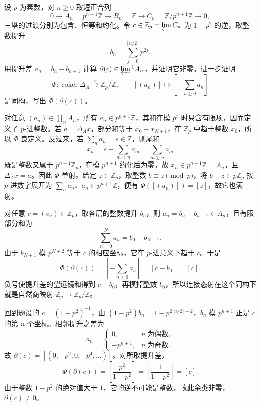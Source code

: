 \begin{exercise}\label{b4:ex:13-boundary-adic-calculation}
	设 \(p\) 为素数，对 \(n\ge0\) 取短正合列
	\[
		0\longrightarrow A_n=p^{n+1}\mathbb Z\longrightarrow B_n=\mathbb Z \longrightarrow C_n=\mathbb Z/p^{n+1}\mathbb Z\longrightarrow0,
	\]
	三塔的过渡分别为包含、恒等和约化。令 \(c\in\mathbb Z_p=\varprojlim C_n\) 为 \(1-p^2\) 的逆，取整数提升
	\[
		b_n=\sum_{j=0}^{\lfloor n/2\rfloor}p^{2j}.
	\]
	用提升差 \(a_n=b_n-b_{n+1}\) 计算 \(\partial(c)\in\varprojlim{}^1A_n\)，并证明它非零。进一步证明
	\[
		\Phi:\operatorname{coker}\Delta_A\xrightarrow{\sim}\mathbb Z_p/\mathbb Z, \qquad [(a_n)]\longmapsto\left[-\sum_{n\ge0}a_n\right]
	\]
	是同构，写出 \(\Phi(\partial(c))\)。
\end{exercise}
\begin{solution}
	对任意 \((a_n)\in\prod_nA_n\)，所有 \(a_n\in p^{n+1}\mathbb Z\)，其和在模 \(p^r\) 时只含有限项，因而定义了 \(p\)-进整数。若 \(a=\Delta_Ax\)，部分和等于 \(x_0-x_{N+1}\)，在 \(\mathbb Z_p\) 中趋于整数 \(x_0\)，所以 \(\Phi\) 良定义。反过来，若 \(\sum_na_n=s\in\mathbb Z\)，则尾和
	\[
		x_n=s-\sum_{m<n}a_m=\sum_{m\ge n}a_m
	\]
	既是整数又属于 \(p^{n+1}\mathbb Z_p\)，在模 \(p^{n+1}\) 约化后为零，故 \(x_n\in p^{n+1}\mathbb Z=A_n\)，且 \(\Delta_Ax=a\)。因此 \(\Phi\) 单射。给定 \(z\in\mathbb Z_p\)，取整数 \(b\equiv z\pmod p\)，将 \(b-z\in p\mathbb Z_p\) 按 \(p\)-进数字展开为 \(\sum_na_n\)、\(a_n\in p^{n+1}\mathbb Z\)，便有 \(\Phi([(a_n)])=[z]\)，故它也满射。

	对任意 \(c=(c_n)\in\mathbb Z_p\)，取各层的整数提升 \(b_n\)，则 \(a_n=b_n-b_{n+1}\in A_n\)，且有限部分和为
	\[
		\sum_{n=0}^Na_n=b_0-b_{N+1}.
	\]
	由于 \(b_{N+1}\) 模 \(p^{N+2}\) 等于 \(c\) 的相应坐标，它在 \(p\)-进意义下趋于 \(c\)。于是
	\[
		\Phi(\partial(c)) =\left[-\sum_{n\ge0}a_n\right] =[c-b_0]=[c].
	\]
	负号使提升差的望远镜和得到 \(c-b_0\)，再模掉整数 \(b_0\)，所以连接态射在这个同构下就是自然商映射 \(\mathbb Z_p\to\mathbb Z_p/\mathbb Z\)。

	回到题设的 \(c=(1-p^2)^{-1}\)，由 \((1-p^2)b_n=1-p^{2\lfloor n/2\rfloor+2}\)，\(b_n\) 模 \(p^{n+1}\) 正是 \(c\) 的第 \(n\) 个坐标。相邻提升之差为
	\[
		a_n=
		\begin{cases}
			0,&n\;\text{为偶数},\\
			-p^{n+1},&n\;\text{为奇数}.
		\end{cases}
	\]
	故 \(\partial(c)=[(0,-p^2,0,-p^4,\ldots)]\)。对所取提升差，
	\[
		\Phi(\partial(c)) =\left[\dfrac{p^2}{1-p^2}\right] =\left[\dfrac{1}{1-p^2}\right]=[c].
	\]
	由于整数 \(1-p^2\) 的绝对值大于 \(1\)，它的逆不可能是整数，故此余类非零，\(\partial(c)\ne0\)。
\end{solution}
